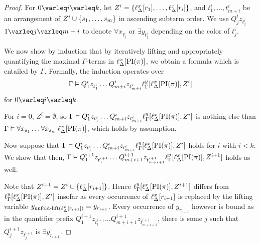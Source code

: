 \begin{proof}
	For $0\varleq i \varleq k$,
	let $Z^i = \{ \ell_{\Delta}^{x}[r_1], \dots, \ell_{\Delta}^{x}[r_i] \}$,
	and
	$t_1^i, \dots, t_{m+i}^i$ be an arrangement of $Z^i \cup \{ s_1, \dots, s_m \}$ in ascending subterm order.
	We use $Q_j^i z_{t_j^i}$ $1\varleq j \varleq m+i$ to denote $\forall x_{t_j^i}$ or $\exists y_{t_j^i}$ depending on the color of $t_j^i$.

	We now show by induction that by iteratively lifting and appropriately quantifying the maximal $\Gamma$-terms in $\ell_{\Delta}^{x}[\operatorname{PI}(\pi)]$, we obtain a formula which is entailed by $\Gamma$.
	Formally, the induction operates over \[\Gamma \vDash Q_1^i z_{t_1^i} \dots Q_{m+i}^i z_{t_{m+i}^i} \ell_{\Gamma}^{y}[ \ell_{\Delta}^{x}[\operatorname{PI}(\pi) ], Z^i ]\] for $0 \varleq i \varleq k$.

	For $i=0$, $Z^i = \emptyset$, so $\Gamma \vDash Q_1^i z_{t_1^i} \dots Q_{m+i}^i z_{t_{m+i}^i} \ell_{\Gamma}^{y}[ \ell_{\Delta}^{x}[\operatorname{PI}(\pi) ], Z^i ]$ is nothing else than $\Gamma \vDash \forall x_{s_1} \ldots \forall x_{s_m}\,\ell_{\Delta}^{x}[\operatorname{PI}(\pi)]$, which holds by assumption.

	Now suppose that $\Gamma \vDash Q_1^i z_{t_1^i} \dots Q_{m+i}^i z_{t_{m+i}^i} \ell_{\Gamma}^{y}[ \ell_{\Delta}^{x}[\operatorname{PI}(\pi) ], Z^i ]$ holds for $i$ with $i < k$.
	We show that then, $\Gamma \vDash Q_1^{i+1} z_{t_1^{i+1}} \dots Q_{m+{i+1}}^{i+1} z_{t_{m+{i+1}}^{i+1}} \ell_{\Gamma}^{y}[ \ell_{\Delta}^{x}[\operatorname{PI}(\pi) ], Z^{i+1} ]$ holds as well.

	Note that $Z^{i+1} = Z^i \cup \{ \ell_{\Delta}^{x}[r_{i+1}] \}$. 
	Hence $\ell_{\Gamma}^{y}[ \ell_{\Delta}^{x}[\operatorname{PI}(\pi) ], Z^{i+1} ]$ differs from $\ell_{\Gamma}^{y}[ \ell_{\Delta}^{x}[\operatorname{PI}(\pi) ], Z^i ]$ insofar as every occurrence of $\ell_{\Delta}^{x}[r_{i+1}]$ is replaced by the lifting variable $y_{\operatorname{unfold-lift}(\ell_{\Delta}^{x}[r_{i+1}])} = y_{r_{i+1}}$. 
	Every occurrence of $y_{r_{i+1}}$ however is bound as 
	in the quantifier prefix
	$Q_1^{i+1} z_{t_1^{i+1}} \dots Q_{m+{i+1}}^{i+1} z_{t_{m+{i+1}}^{i+1}}$, there is some $j$ such that $Q_j^{i+1} z_{t_j^{i+1}}$ is $\exists y_{r_{i+1}}$.


\end{proof}
